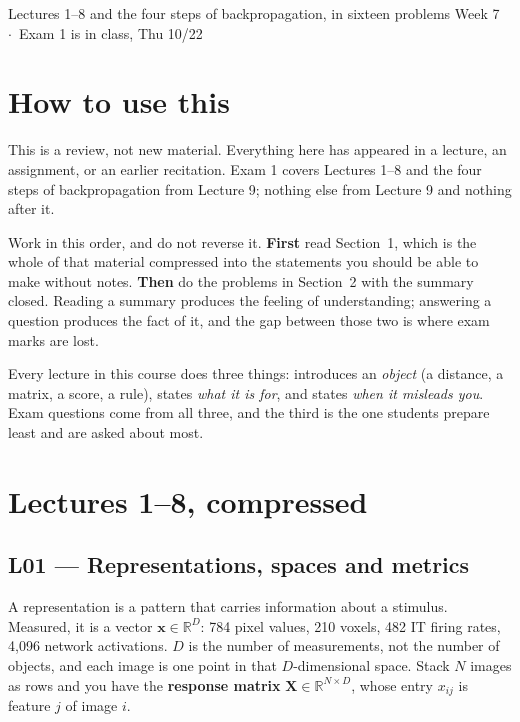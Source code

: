 \documentclass[11pt]{article}
\begin{document}
  {Lectures 1--8 and the four steps of backpropagation, in sixteen problems}
  {Week 7 \ $\cdot$\ Exam 1 is in class, Thu 10/22}

\section*{How to use this}

This is a review, not new material. Everything here has appeared in a lecture,
an assignment, or an earlier recitation. Exam 1 covers Lectures 1--8 and the
four steps of backpropagation from Lecture 9; nothing else from Lecture 9 and
nothing after it.

Work in this order, and do not reverse it. \textbf{First} read Section~1, which
is the whole of that material compressed into the statements you should be able
to make without notes. \textbf{Then} do the problems in Section~2 with the
summary closed. Reading a summary produces the feeling of understanding;
answering a question produces the fact of it, and the gap between those two is
where exam marks are lost.

\begin{keybox}
 Every lecture in this course does three things:
introduces an \emph{object} (a distance, a matrix, a score, a rule), states
\emph{what it is for}, and states \emph{when it misleads you}. Exam questions
come from all three, and the third is the one students prepare least and are
asked about most.
\end{keybox}

\section{Lectures 1--8, compressed}

\subsection{L01 --- Representations, spaces and metrics}

A representation is a pattern that carries information about a stimulus.
Measured, it is a vector $\mathbf{x}\in\mathbb{R}^{D}$: 784 pixel values, 210
voxels, 482 IT firing rates, 4,096 network activations. $D$ is the number of
measurements, not the number of objects, and each image is one point in that
$D$-dimensional space. Stack $N$ images as rows and you have the
\textbf{response matrix} $\mathbf{X}\in\mathbb{R}^{N\times D}$, whose entry
$x_{ij}$ is feature $j$ of image $i$.
\end{document}
